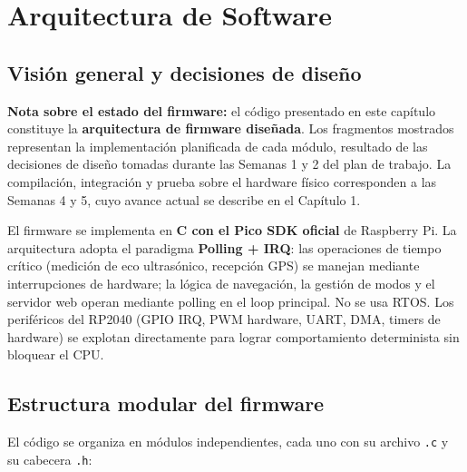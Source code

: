 \documentclass[12pt]{report}
\begin{document}
\chapter{Arquitectura de Software}

\section{Visión general y decisiones de diseño}

\textbf{Nota sobre el estado del firmware:} el código presentado en este capítulo constituye la \textbf{arquitectura de firmware diseñada}. Los fragmentos mostrados representan la implementación planificada de cada módulo, resultado de las decisiones de diseño tomadas durante las Semanas 1 y 2 del plan de trabajo. La compilación, integración y prueba sobre el hardware físico corresponden a las Semanas 4 y 5, cuyo avance actual se describe en el Capítulo 1.

El firmware se implementa en \textbf{C con el Pico SDK oficial} de Raspberry Pi. La arquitectura adopta el paradigma \textbf{Polling + IRQ}: las operaciones de tiempo crítico (medición de eco ultrasónico, recepción GPS) se manejan mediante interrupciones de hardware; la lógica de navegación, la gestión de modos y el servidor web operan mediante polling en el loop principal. No se usa RTOS. Los periféricos del RP2040 (GPIO IRQ, PWM hardware, UART, DMA, timers de hardware) se explotan directamente para lograr comportamiento determinista sin bloquear el CPU.

\section{Estructura modular del firmware}

El código se organiza en módulos independientes, cada uno con su archivo \texttt{.c} y su cabecera \texttt{.h}:
\end{document}
